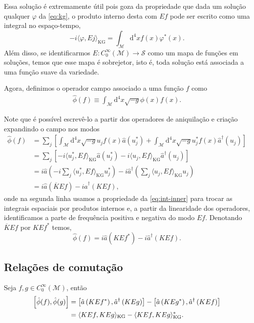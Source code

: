 \documentclass[12pt]{article}
\newcommand{\m}{\mathcal{M}}
\newcommand{\s}{\mathcal{S}}
\newcommand{\dd}{\mathrm{d}}
\newcommand{\innerkg}[2]{\langle#1,#2\rangle_{\text{KG}}}
\begin{document}
Essa solução é extremamente útil pois goza da propriedade que dada um solução qualquer \(\varphi\) da \cref{eq:kg}, o produto interno desta com \(Ef\) pode ser escrito como uma integral no espaço-tempo,
\begin{equation}
    -i\innerkg{\varphi}{Ej}=\int_\m\dd^4xf(x)\varphi^*(x).
    \label{eq:int-inner}
\end{equation}
Além disso, se identificarmos \(E:C_0^{\infty}(\m)\to\s\) como um mapa de funções em soluções, temos que esse mapa é sobrejetor, isto é, toda solução está associada a uma função suave da variedade.

Agora, definimos o operador campo associado a uma função \(f\) como
\begin{subequations}
    \begin{align}
        \hat{\phi}(f)\equiv\int_\m\dd^4x\sqrt{-g}\phi(x)f(x).
    \end{align}
\end{subequations}

Note que é possível escrevê-lo a partir dos operadores de aniquilação e criação expandindo o campo nos modos
\begin{subequations}
    \begin{align}
        \hat{\phi}(f)&=\sum_j\left[\int_\m\dd^4x\sqrt{-g}u_jf(x)\hat{a}(u_j^*)+\int_\m\dd^4x\sqrt{-g}u_j^*f(x)\hat{a}^{\dagger}(u_j)\right]\\
        &=\sum_j\left[-i\innerkg{u_j^*}{Ef}\hat{a}(u_j^*)-i\innerkg{u_j}{Ef}\hat{a}^\dagger(u_j)\right]\\
        &=i\hat{a}\left(-i\sum_j\innerkg{u_j^*}{Ef}u^*_j\right)-i\hat{a}^\dagger\left(\sum_j\innerkg{u_j}{Ef}u_j\right)\\
        &=i\hat{a}\left(\overline{K}Ef\right)-i\hat{a}^\dagger\left(KEf\right),
    \end{align}
\end{subequations}
onde na segunda linha usamos a propriedade da \cref{eq:int-inner} para trocar as integrais espaciais por produtos internos e, a partir da linearidade dos operadores, identificamos a parte de frequência positiva e negativa do modo \(Ef\). Denotando \(\overline{K}Ef\) por \(KEf^*\) temos,
\begin{equation}
    \hat{\phi}(f)=i\hat{a}\left(KEf^*\right)-i\hat{a}^\dagger\left(KEf\right).
    \label{eq:campo}
\end{equation}

\subsection*{Relações de comutação}
Seja \(f,g\in C_0^{\infty}(\m)\), então
\begin{subequations}
    \begin{align}
        \relax\left[\hat{\phi}(f),\hat{\phi}(g)\right]&=\left[\hat{a}\left(KEf^*\right),\hat{a}^\dagger\left(KEg\right)\right]-\left[\hat{a}\left(KEg^*\right),\hat{a}^\dagger\left(KEf\right)\right]\\
        &=\innerkg{KEf}{KEg}-\innerkg{KEf}{KEg}^*.
    \end{align}
    \label{eq:comuta}
\end{subequations}
\end{document}

